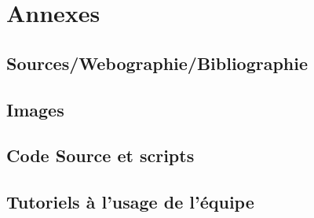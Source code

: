\documentclass[a4paper,12pt,one side,titlepage]{report}
\begin{document}
\part{Annexes}
\chapter{Sources/Webographie/Bibliographie}

\chapter{Images}

\chapter{Code Source et scripts}

\chapter{Tutoriels à l'usage de l'équipe}




\printglossaries
\end{document}
